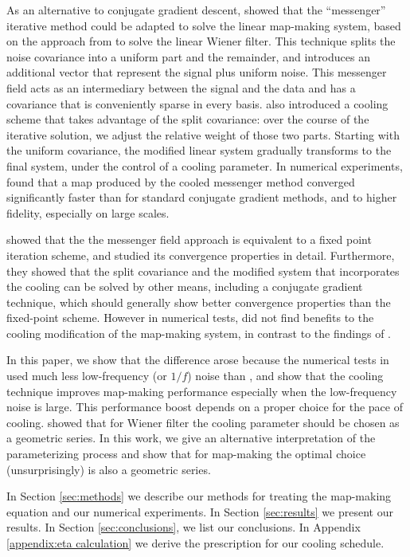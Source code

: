 \documentclass[twocolumn,linenumbers]{aastex631}
\begin{document}
As an alternative to conjugate gradient descent, \citet{Huffenberger_2018} showed that the ``messenger'' iterative method could be adapted to solve the linear map-making system, based on the  approach from \cite{2013A&A...549A.111E} to solve the linear Wiener filter.
This technique splits the noise covariance into a uniform part and the remainder, and introduces an additional vector that represent the signal plus uniform noise.
This messenger field acts as an intermediary between the signal and the data and has a covariance that is conveniently sparse in every basis.
\cite{2013A&A...549A.111E} also introduced a cooling scheme that takes advantage of the split covariance: over the course of the iterative solution, we adjust the relative weight of those two parts.  Starting with the uniform covariance, the modified linear system gradually transforms to the final system, under the control of a cooling parameter.  In numerical experiments, \citet{Huffenberger_2018} found that a map produced by the cooled messenger method converged significantly faster than for standard conjugate gradient methods, and to higher fidelity, especially on large scales.  

\citet{2018A&A...620A..59P} showed that the the messenger field approach is equivalent to a fixed point iteration scheme, and studied its convergence properties in detail.  Furthermore, they showed that the split covariance and the modified system that incorporates the cooling can be solved by other means, including a conjugate gradient technique, which should generally show better convergence properties than the fixed-point scheme. However in numerical tests, \citet{2018A&A...620A..59P} did not find benefits to the cooling modification of the map-making system, in contrast to the findings of \citet{Huffenberger_2018}.

In this paper, we show that the difference arose because the numerical tests in \citet{2018A&A...620A..59P} used much less low-frequency (or $1/f$) noise than \citet{Huffenberger_2018}, and show that the cooling technique improves map-making performance especially when the low-frequency noise is large.  This performance boost depends on a proper choice for the pace of cooling.  \citet{2017MNRAS.468.1782K} showed that for Wiener filter the cooling parameter should be chosen as a geometric series.  In this work, we give an alternative interpretation of the parameterizing process and show that for map-making the optimal choice (unsurprisingly) is also a geometric series.


In Section \ref{sec:methods} we describe our methods for treating the map-making equation and our numerical experiments.
In Section \ref{sec:results} we present our results. 
In Section \ref{sec:conclusions}, we list our conclusions.
In Appendix \ref{appendix:eta calculation} we derive the prescription for our cooling schedule.
\end{document}
